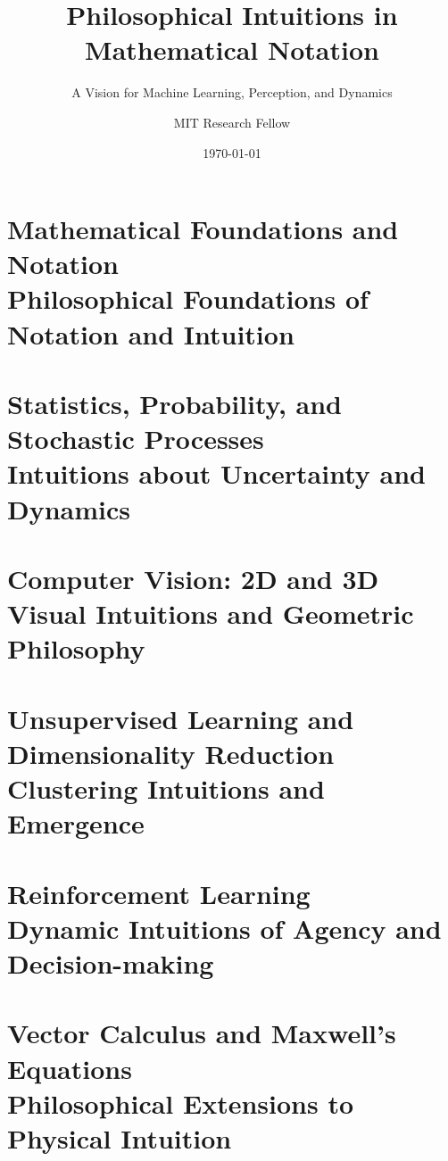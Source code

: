 \documentclass[11pt,openright,twoside]{book}
\title{Philosophical Intuitions in Mathematical Notation}
\subtitle{A Vision for Machine Learning, Perception, and Dynamics}
\author{MIT Research Fellow}
\date{\today}
\begin{document}
\frontmatter


\tableofcontents


\mainmatter{}

\part{Mathematical Foundations and Notation\\
	\large Philosophical Foundations of Notation and Intuition}


\part{Statistics, Probability, and Stochastic Processes\\
	\large Intuitions about Uncertainty and Dynamics}


\part{Computer Vision: 2D and 3D\\
	\large Visual Intuitions and Geometric Philosophy}


\part{Unsupervised Learning and Dimensionality Reduction\\
	\large Clustering Intuitions and Emergence}


\part{Reinforcement Learning\\
	\large Dynamic Intuitions of Agency and Decision-making}


\part{Vector Calculus and Maxwell's Equations\\
	\large Philosophical Extensions to Physical Intuition}


\backmatter{}

\printbibliography{}
\end{document}
